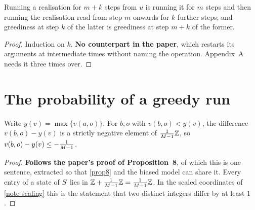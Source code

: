 \begin{lemma}
  \label{aux-shift}
  \leanok
  Running a realisation for $m+k$ steps from $u$ is running it for $m$ steps
  and then running the realisation read from step $m$ onwards for $k$ further
  steps; and greediness at step $k$ of the latter is greediness at step $m+k$
  of the former.
\end{lemma}
\begin{proof}
  \leanok
  Induction on $k$.  \textbf{No counterpart in the paper}, which restarts its
  arguments at intermediate times without naming the operation.  Appendix~A
  needs it three times over.
\end{proof}

\section{The probability of a greedy run}

\begin{lemma}
  \label{aux-gap}
  \leanok
  Write $y(v) = \max\{v(a,o)\}$.  For $b, o$ with $v(b,o) < y(v)$, the difference
  $v(b,o) - y(v)$ is a strictly negative element of $\tfrac{1}{M-1}\mathbb{Z}$, so
  $v(b,o) - y(v) \le -\tfrac{1}{M-1}$.
\end{lemma}
\begin{proof}
  \leanok
  \textbf{Follows the paper's proof of Proposition~8}, of which this is one
  sentence, extracted so that \ref{prop8} and the biased model can share it.
  Every entry of a state of $S$ lies in $\mathbb{Z} + \tfrac{1}{M-1}\mathbb{Z}
  = \tfrac{1}{M-1}\mathbb{Z}$.  In the scaled coordinates of \ref{note-scaling} this
  is the statement that two distinct integers differ by at least $1$.
\end{proof}

